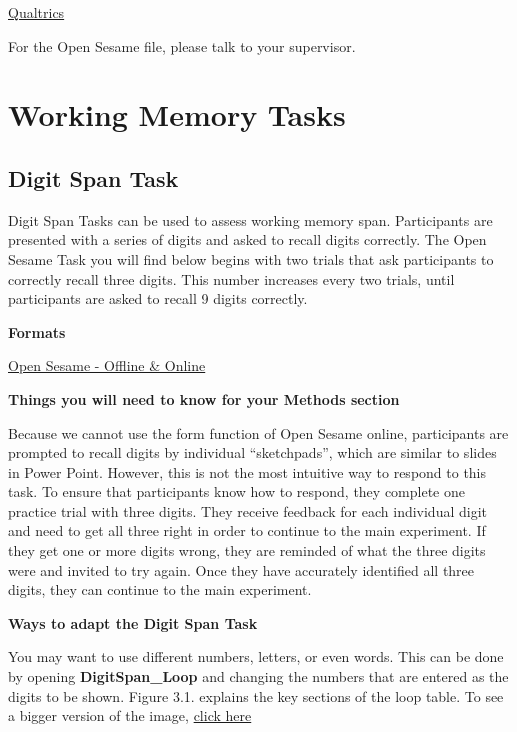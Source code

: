 \documentclass[
]{book}
\begin{document}
\href{link\%20here}{Qualtrics}

For the Open Sesame file, please talk to your supervisor.

\hypertarget{working-memory-tasks}{%
\chapter{Working Memory Tasks}\label{working-memory-tasks}}

\hypertarget{digit-span-task}{%
\section{Digit Span Task}\label{digit-span-task}}

Digit Span Tasks can be used to assess working memory span. Participants are presented with a series of digits and asked to recall digits correctly. The Open Sesame Task you will find below begins with two trials that ask participants to correctly recall three digits. This number increases every two trials, until participants are asked to recall 9 digits correctly.

\textbf{Formats}

\href{https://github.com/jmattschey/MScConversionExperiments/blob/master/GitHub/DigitSpan_Online.zip}{Open Sesame - Offline \& Online}

\textbf{Things you will need to know for your Methods section}

Because we cannot use the form function of Open Sesame online, participants are prompted to recall digits by individual ``sketchpads'', which are similar to slides in Power Point. However, this is not the most intuitive way to respond to this task. To ensure that participants know how to respond, they complete one practice trial with three digits. They receive feedback for each individual digit and need to get all three right in order to continue to the main experiment. If they get one or more digits wrong, they are reminded of what the three digits were and invited to try again. Once they have accurately identified all three digits, they can continue to the main experiment.

\textbf{Ways to adapt the Digit Span Task}

You may want to use different numbers, letters, or even words. This can be done by opening \textbf{DigitSpan\_Loop} and changing the numbers that are entered as the digits to be shown. Figure 3.1. explains the key sections of the loop table. To see a bigger version of the image, \href{https://raw.githubusercontent.com/jmattschey/MScConversionExperiments/master/images/ChangeDigitSpan.png}{click here}
\end{document}
